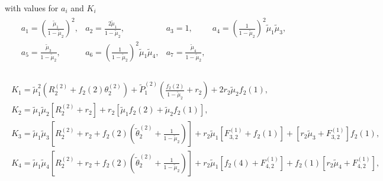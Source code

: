 
with values for $a_{i}$ and $K_{i}$  
\begin{eqnarray}\label{Coefficients.Ais.Exh.uno}
\begin{array}{llll}
a_{1}=\left(\frac{\tilde{\mu}_{1}}{1-\tilde{\mu}_{2}}\right)^{2},&
a_{2}=\frac{2\tilde{\mu}_{1}}{1-\tilde{\mu}_{2}},&
a_{3}=1,&
a_{4}=\left(\frac{1}{1-\tilde{\mu}_{2}}\right)^{2}\tilde{\mu}_{1}\tilde{\mu}_{3},\\
a_{5}=\frac{\tilde{\mu}_{3}}{1-\tilde{\mu}_{2}},&
a_{6}=\left(\frac{1}{1-\tilde{\mu}_{2}}\right)^{2}\tilde{\mu}_{1}\tilde{\mu}_{4},&
a_{7}=\frac{\tilde{\mu}_{4}}{1-\tilde{\mu}_{2}},&\\
\end{array}
\end{eqnarray}%





\begin{eqnarray}\label{Coefficients.kis.Exh.uno}
\begin{array}{l}
K_{1}=\tilde{\mu}_{1}^{2}\left(R_{2}^{(2)}+f_{2}\left(2\right)\theta_{2}^{(2)}\right)
+\tilde{P}_{1}^{(2)}\left(\frac{f_{2}\left(2\right)}{1-\tilde{\mu}_{2}}+r_{2}\right)
+2r_{2}\tilde{\mu}_{2}f_{2}\left(1\right),\\
K_{2}=\tilde{\mu}_{1}\tilde{\mu}_{2}\left[R_{2}^{(2)}
+r_{2}\right]
+r_{2}\left[\tilde{\mu}_{1}f_{2}\left(2\right)
+\tilde{\mu}_{2}f_{2}\left(1\right)\right],\\
K_{3}=\tilde{\mu}_{1}\tilde{\mu}_{3}\left[R_{2}^{(2)}+r_{2}+f_{2}\left(2\right)\left(\tilde{\theta}_{2}^{(2)}+\frac{1}{1-\tilde{\mu}_{2}}\right)\right]
+r_{2}\tilde{\mu}_{1}\left[F_{3,2}^{(1)}+f_{2}\left(1\right)\right]
+\left[r_{2}\tilde{\mu}_{3}+F_{3,2}^{(1)}\right]f_{2}\left(1\right),\\
K_{4}=\tilde{\mu}_{1}\tilde{\mu}_{4}\left[R_{2}^{(2)}
+r_{2}+f_{2}\left(2\right)\left(\tilde{\theta}_{2}^{(2)}
+\frac{1}{1-\tilde{\mu}_{2}}\right)\right]
+r_{2}\tilde{\mu}_{1}\left[f_{2}\left(4\right)+F_{4,2}^{(1)}\right]
+f_{2}\left(1\right)\left[r_{2}\tilde{\mu}_{4}+F_{4,2}^{(1)}\right],
\end{array}
\end{eqnarray}

\newpage
